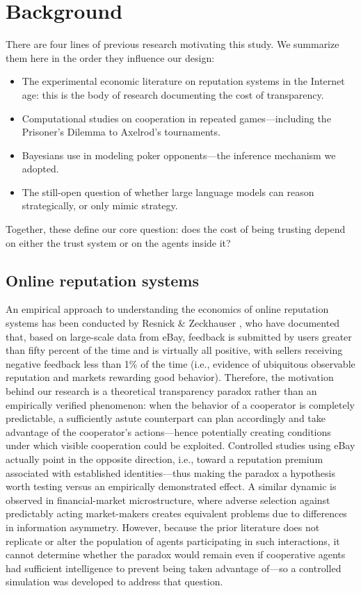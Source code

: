 \documentclass[10pt]{article} %
\begin{document}
\section{Background}

There are four lines of previous research motivating this study. We
summarize them here in the order they influence our design:
\begin{itemize}\itemsep2pt
  \item The experimental economic literature on reputation systems in
  the Internet age: this is the body of research documenting the cost
  of transparency.
  \item Computational studies on cooperation in repeated
  games---including the Prisoner's Dilemma to Axelrod's tournaments.
  \item Bayesians use in modeling poker opponents---the inference
  mechanism we adopted.
  \item The still-open question of whether large language models can
  reason strategically, or only mimic strategy.
\end{itemize}
Together, these define our core question: does the cost of being
trusting depend on either the trust system or on the agents inside
it?

\subsection{Online reputation systems}
An empirical approach to understanding the economics of online
reputation systems has been conducted by Resnick \& Zeckhauser
\citep{resnick2002trust}, who have documented that, based on
large-scale data from eBay, feedback is submitted by users greater
than fifty percent of the time and is virtually all positive, with
sellers receiving negative feedback less than 1\% of the time (i.e.,
evidence of ubiquitous observable reputation and markets rewarding
good behavior). Therefore, the motivation behind our research is a
theoretical transparency paradox rather than an empirically verified
phenomenon: when the behavior of a cooperator is completely
predictable, a sufficiently astute counterpart can plan accordingly
and take advantage of the cooperator's actions---hence potentially
creating conditions under which visible cooperation could be
exploited. Controlled studies using eBay actually point in the
opposite direction, i.e., toward a reputation premium associated with
established identities---thus making the paradox a hypothesis worth
testing versus an empirically demonstrated effect. A similar dynamic
is observed in financial-market microstructure, where adverse
selection against predictably acting market-makers
\citep{glosten1985bid} creates equivalent problems due to differences
in information asymmetry. However, because the prior literature does
not replicate or alter the population of agents participating in such
interactions, it cannot determine whether the paradox would remain
even if cooperative agents had sufficient intelligence to prevent
being taken advantage of---so a controlled simulation was developed
to address that question.
\end{document}

